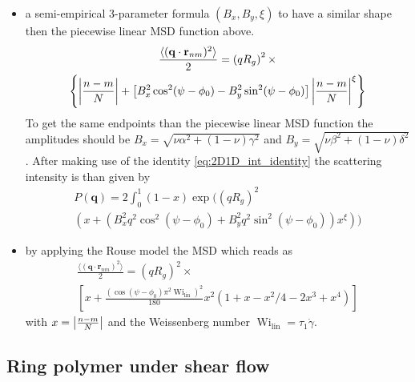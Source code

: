 \begin{itemize}
\item  a semi-empirical 3-parameter formula $(B_x,B_y,\xi)$ to have a similar shape then the piecewise linear MSD function above.
    \begin{multline}
    \frac{\langle(\mathbf{q}\cdot\mathbf{r}_{nm})^2\rangle}{2} =\left(qR_g\right)^2 \times \\
    \left\{
      {\left\vert\frac{n-m}{N}\right\vert} + \left[B_x^2\cos^2(\psi-\phi_0)-B_y^2\sin^2(\psi-\phi_0)\right]{\left\vert\frac{n-m}{N}\right\vert}^\xi
    \right\}
    \end{multline}
    To get the same endpoints than the piecewise linear MSD function the amplitudes should be $B_x=\sqrt{\nu\alpha^2+(1-\nu)\gamma^2}$ and $B_y=\sqrt{\nu\beta^2+(1-\nu)\delta^2}$.
    After making use of the identity \ref{eq:2D1D_int_identity} the scattering intensity is than given by
    \begin{multline}
      P(\mathbf{q}) = 2 \int_0^1 (1-x) \exp\Bigg( \left(qR_g\right)^2\\
      \left(
      x + \left(B_x^2q^2\cos^2(\psi-\phi_0)+B_y^2q^2\sin^2(\psi-\phi_0)\right)x^\xi
      \right)\Bigg)
    \end{multline}
\item by applying the Rouse model \cite{Korolkovas2019} the MSD which reads as
    \begin{multline}\label{eq:MSDlinearShearFlow}
    \frac{\langle(\mathbf{q}\cdot\mathbf{r}_{nm})^2\rangle}{2} = \left(qR_g\right)^2 \times \\ \left[ x+\frac{\left(\cos(\psi-\phi_0)\pi^2\operatorname{Wi}_\mathrm{lin}\right)^2}{180} x^2\left(1+x-x^2/4-2x^3+x^4\right) \right]
    \end{multline}
    with $x={\left\vert\frac{n-m}{N}\right\vert}$ and the Weissenberg number $\operatorname{Wi}_\mathrm{lin}=\tau_1\dot{\gamma}$.
\end{itemize}

\subsection{Ring polymer under shear flow}~\\
\label{sect:RingPolymerShearFlow}

